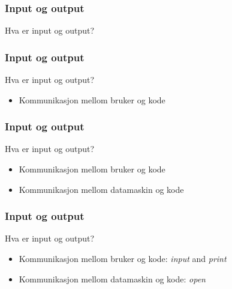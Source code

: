 
\begin{frame}
    \frametitle{Input og output}

    Hva er input og output?

\end{frame}

\begin{frame}
    \frametitle{Input og output}

    Hva er input og output?

    \begin{itemize}
        \item Kommunikasjon mellom bruker og kode
    \end{itemize}

\end{frame}

\begin{frame}
    \frametitle{Input og output}

    Hva er input og output?

    \begin{itemize}
        \item Kommunikasjon mellom bruker og kode
        \item Kommunikasjon mellom datamaskin og kode
    \end{itemize}

\end{frame}

\begin{frame}
    \frametitle{Input og output}

    Hva er input og output?

    \begin{itemize}
        \item Kommunikasjon mellom bruker og kode: \textit{input} and \textit{print}
        \item Kommunikasjon mellom datamaskin og kode: \textit{open}
    \end{itemize}

\end{frame}
